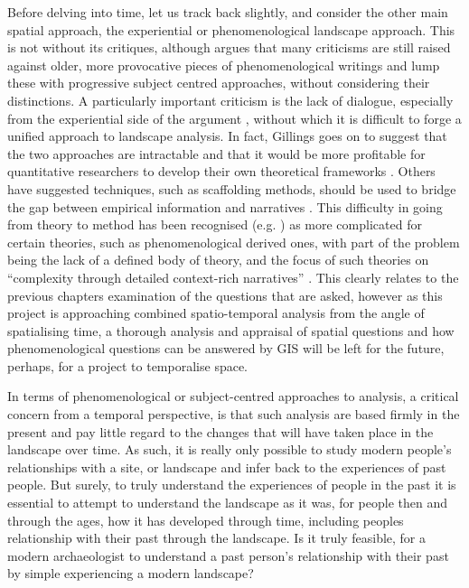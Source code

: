 Before delving into time, let us track back slightly, and consider the other main spatial approach, the experiential or phenomenological landscape approach. This is not without its critiques, although \citet[512]{Rennell2012} argues that many criticisms are still raised against older, more provocative pieces of phenomenological writings and lump these with progressive subject centred approaches, without considering their distinctions. A particularly important criticism is the lack of dialogue, especially from the experiential side of the argument \citep[601]{Gillings2012}, without which it is difficult to forge a unified approach to landscape analysis. In fact, Gillings goes on to suggest that the two approaches are intractable and that it would be more profitable for quantitative researchers to develop their own theoretical frameworks \citep[610]{Gillings2012}. Others have suggested techniques, such as scaffolding methods, should be used to bridge the gap between empirical information and narratives \citep{Llobera2012}. This difficulty in going from theory to method has been recognised (e.g. \citealp[500]{Llobera2012}) as more complicated for certain theories, such as phenomenological derived ones, with part of the problem being the lack of a defined body of theory, and the focus of such theories on ``complexity through detailed context-rich narratives'' \citep[503]{Llobera2012}. This clearly relates to the previous chapters examination of the questions that are asked, however as this project is approaching combined spatio-temporal analysis from the angle of spatialising time, a thorough analysis and appraisal of spatial questions and how phenomenological questions can be answered by GIS will be left for the future, perhaps, for a project to temporalise space.

In terms of phenomenological or subject-centred approaches to analysis, a critical concern from a temporal perspective, is that such analysis are based firmly in the present and pay little regard to the changes that will have taken place in the landscape over time. As such, it is really only possible to study modern people's relationships with a site, or landscape and infer back to the experiences of past people. But surely, to truly understand the experiences of people in the past it is essential to attempt to understand the landscape as it was, for people then and through the ages, how it has developed through time, including peoples relationship with their past through the landscape. Is it truly feasible, for a modern archaeologist to understand a past person's relationship with their past by simple experiencing a modern landscape? 

